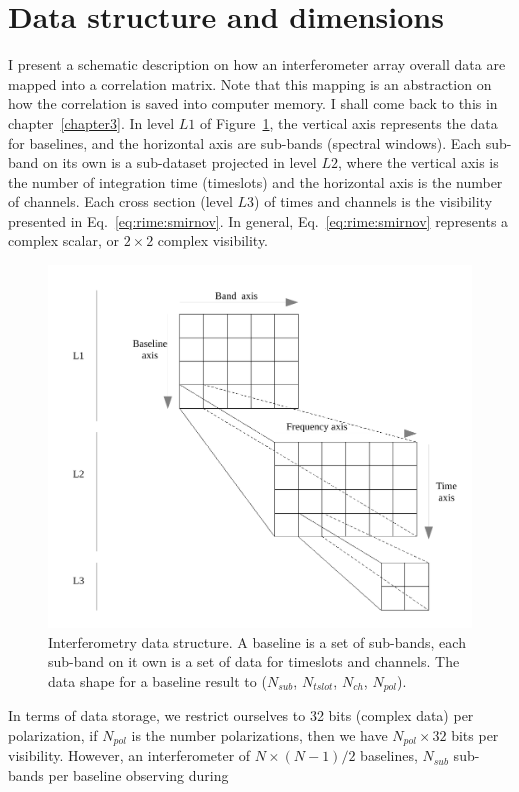 \documentclass[useAMS,usenatbib]{mn2e}
\begin{document}
\section{Data structure and dimensions}
\newcommand{\LLA}{L1}
\newcommand{\LLB}{L2}
\newcommand{\LLC}{L3}
I present a schematic description  on how an interferometer array overall data are mapped  into a correlation matrix. 
Note that this mapping is an 
abstraction on how the correlation is saved into computer memory. I shall come back to this in 
chapter~\ref{chapter3}. In level $\LLA$ of Figure~\ref{fig:datastructure}, the vertical axis represents the data 
for baselines, and the horizontal axis are sub-bands (spectral windows). Each sub-band on its own is a sub-dataset projected
in level $\LLB$, where the vertical axis is the number of integration time (timeslots) and the  horizontal axis is the number 
of channels. Each cross section (level $\LLC$) of times and channels is the visibility presented in Eq.~\ref{eq:rime:smirnov}.
In general, Eq.~\ref{eq:rime:smirnov}  represents a complex scalar, or $2 \times 2$ complex visibility.
\begin{figure}
  \centering
  \includegraphics[width=.7\linewidth]{./Figures/data_structure_bis.pdf}
\caption{Interferometry data structure. A baseline is a set of sub-bands, each sub-band on it own is a set of
data for timeslots and channels. The data shape for a baseline result to
($N_{sub}$, $N_{tslot}$, $N_{ch}$, $N_{pol}$).}
\label{fig:datastructure}
\end{figure}
In terms of data storage, we restrict ourselves to 32 bits (complex data) per polarization, if  $N_{pol}$ is the
number polarizations, then we have $N_{pol}\times 32$ bits per visibility. However,
an interferometer of $N\times(N-1)/2$ baselines,  $N_{sub}$ sub-bands per baseline observing during
\end{document}
